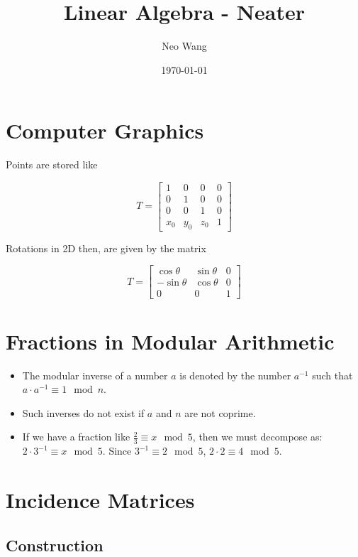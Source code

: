 \documentclass{article}
\title{Linear Algebra - Neater}
\author{Neo Wang}
\date{\today}
\begin{document}
\maketitle
\tableofcontents

\section{Computer Graphics}

Points are stored like

$$
T = \begin{bmatrix}
	1 & 0 & 0 & 0 \\
	0 & 1 & 0 & 0 \\
	0 & 0 & 1 & 0 \\
	x_0 & y_0 & z_0 & 1
\end{bmatrix}
$$

Rotations in 2D then, are given by the matrix

$$
T = \begin{bmatrix}
	\cos \theta & \sin \theta & 0 \\
	-\sin \theta & \cos \theta & 0 \\
	0 & 0 & 1
\end{bmatrix}
$$

\section{Fractions in Modular Arithmetic}

\begin{itemize}
	\item The modular inverse of a number $a$ is denoted by the number $a^{-1}$ such that $a \cdot a^{-1} \equiv 1 \mod{n}$.
	\item Such inverses do not exist if $a$ and $n$ are not coprime.
	\item If we have a fraction like $\frac{2}{3}\equiv x\mod{5}$, then we must decompose as: $2\cdot 3^{-1}\equiv x \mod{5}$. Since $3^{-1}\equiv 2 \mod 5$, $2 \cdot 2 \equiv 4 \mod{5}$.
\end{itemize}

\section{Incidence Matrices}

\subsection{Construction}
\end{document}
